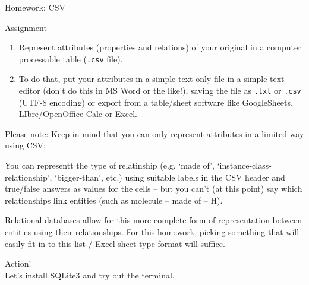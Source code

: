 \begin{frame}{Homework: CSV}
    \begin{alertblock}{Assignment}
    \begin{enumerate}\footnotesize
        \item Represent attributes (properties and relations) of your original in a computer processable table (\texttt{.csv} file).
        \item To do that, put your attributes in a simple text-only file in a simple text editor (don't do this in MS Word or the like!), saving the file as \texttt{.txt} or \texttt{.csv} (UTF-8 encoding) or export from a table/sheet software like GoogleSheets, LIbre/OpenOffice Calc or Excel. 
    \end{enumerate}
\end{alertblock}

\begin{block}{Please note:}\tiny
Keep in mind that you can only represent attributes in a limited way using CSV:

You can representt the type of relatinship (e.g. `made of', `instance-class-relationship', `bigger-than', etc.) using suitable labels in the CSV header and true/false answers as values for the cells -- but you can't (at this point) say which relationships link entities (such as molecule -- made of -- H).

Relational databases allow for this more complete form of representation between entities using their relationships. For this homework, picking something that will easily fit in to this list / Excel sheet type format will suffice. 
\end{block}
\end{frame}


\begin{frame}[standout]
    \alert{Action!} \\
    Let's install SQLite3 and try out the terminal.
\end{frame}
